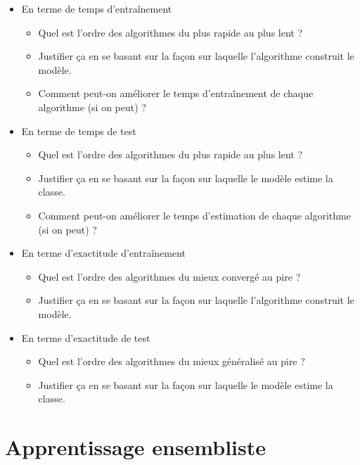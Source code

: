 \documentclass[12pt, a4paper]{article}
\begin{document}
\begin{itemize}
	\item En terme de temps d'entraînement
	\begin{itemize}
		\item Quel est l'ordre des algorithmes du plus rapide au plus lent ?
		\item Justifier ça en se basant sur la façon sur laquelle l'algorithme construit le modèle.
		\item Comment peut-on améliorer le temps d'entraînement de chaque algorithme (si on peut) ?
	\end{itemize}
	\item En terme de temps de test
	\begin{itemize}
		\item Quel est l'ordre des algorithmes du plus rapide au plus lent ?
		\item Justifier ça en se basant sur la façon sur laquelle le modèle estime la classe.
		\item Comment peut-on améliorer le temps d'estimation de chaque algorithme (si on peut) ?
	\end{itemize}
	\item En terme d'exactitude d'entraînement
	\begin{itemize}
		\item Quel est l'ordre des algorithmes du mieux convergé au pire ?
		\item Justifier ça en se basant sur la façon sur laquelle l'algorithme construit le modèle.
	\end{itemize}
	\item En terme d'exactitude de test
	\begin{itemize}
		\item Quel est l'ordre des algorithmes du mieux généralisé au pire ?
		\item Justifier ça en se basant sur la façon sur laquelle le modèle estime la classe.
	\end{itemize}
\end{itemize}

\section{Apprentissage ensembliste}
\end{document}
